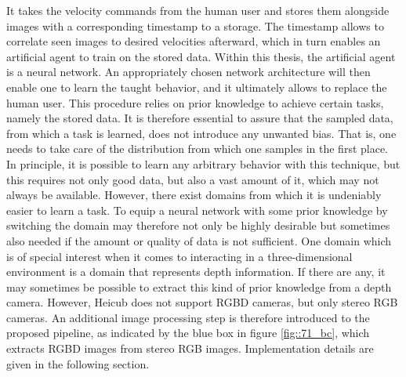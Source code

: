 It takes the velocity commands from the human user and stores them alongside images with a corresponding timestamp to a storage. The timestamp allows to correlate seen images to desired velocities afterward, which in turn enables an artificial agent to train on the stored data. Within this thesis, the artificial agent is a neural network. An appropriately chosen network architecture will then enable one to learn the taught behavior, and it ultimately allows to replace the human user. This procedure relies on prior knowledge to achieve certain tasks, namely the stored data. It is therefore essential to assure that the sampled data, from which a task is learned, does not introduce any unwanted bias. That is, one needs to take care of the distribution from which one samples in the first place. In principle, it is possible to learn any arbitrary behavior with this technique, but this requires not only good data, but also a vast amount of it, which may not always be available. However, there exist domains from which it is undeniably easier to learn a task. To equip a neural network with some prior knowledge by switching the domain may therefore not only be highly desirable but sometimes also needed if the amount or quality of data is not sufficient. One domain which is of special interest when it comes to interacting in a three-dimensional environment is a domain that represents depth information. If there are any, it may sometimes be possible to extract this kind of prior knowledge from a depth camera. However, Heicub does not support RGBD cameras, but only stereo RGB cameras. An additional image processing step is therefore introduced to the proposed pipeline, as indicated by the blue box in figure \ref{fig::71_bc}, which extracts RGBD images from stereo RGB images. Implementation details are given in the following section.
\FloatBarrier
